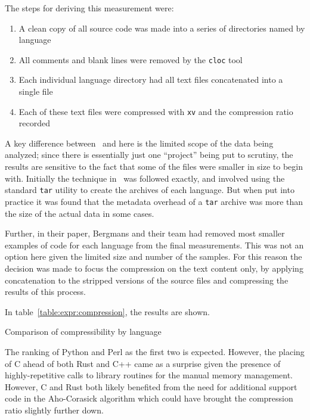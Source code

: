 The steps for deriving this measurement were:

\begin{enumerate}
\item A clean copy of all source code was made into a series of directories named by language
\item All comments and blank lines were removed by the \texttt{cloc} tool
\item Each individual language directory had all text files concatenated into a single file
\item Each of these text files were compressed with \texttt{xv} and the compression ratio recorded
\end{enumerate}

A key difference between~\cite{bergmans} and here is the limited scope of the data being analyzed; since there is essentially just one ``project'' being put to scrutiny, the results are sensitive to the fact that some of the files were smaller in size to begin with. Initially the technique in~\cite{bergmans} was followed exactly, and involved using the standard \texttt{tar} utility to create the archives of each language. But when put into practice it was found that the metadata overhead of a \texttt{tar} archive was more than the size of the actual data in some cases.

Further, in their paper, Bergmans and their team had removed most smaller examples of code for each language from the final measurements. This was not an option here given the limited size and number of the samples. For this reason the decision was made to focus the compression on the text content only, by applying concatenation to the stripped versions of the source files and compressing the results of this process.

In table~\ref{table:expr:compression}, the results are shown.

\begin{table}[!htb]

\caption{Comparison of compressibility by language}
\label{table:expr:compression}
\end{table}

The ranking of Python and Perl as the first two is expected. However, the placing of C ahead of both Rust and C++ came as a surprise given the presence of highly-repetitive calls to library routines for the manual memory management. However, C and Rust both likely benefited from the need for additional support code in the Aho-Corasick algorithm which could have brought the compression ratio slightly further down.

